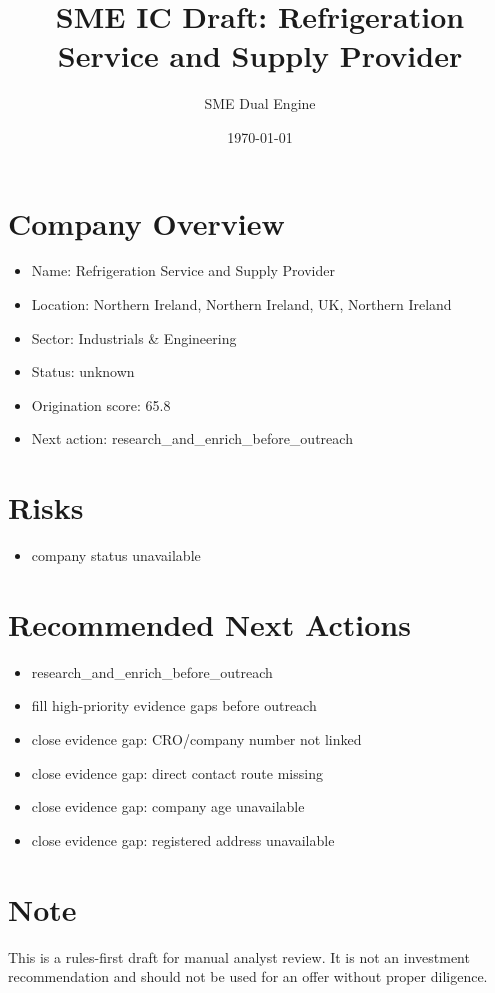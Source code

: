 \documentclass[11pt,a4paper]{article}
\title{SME IC Draft: Refrigeration Service and Supply Provider}
\author{SME Dual Engine}
\date{\today}
\begin{document}
\maketitle
\section*{Company Overview}
\begin{itemize}[leftmargin=1.4em]
\item Name: Refrigeration Service and Supply Provider
\item Location: Northern Ireland, Northern Ireland, UK, Northern Ireland
\item Sector: Industrials \& Engineering
\item Status: unknown
\item Origination score: 65.8
\item Next action: research\_and\_enrich\_before\_outreach
\end{itemize}
\section*{Risks}
\begin{itemize}[leftmargin=1.4em]
\item company status unavailable
\end{itemize}
\section*{Recommended Next Actions}
\begin{itemize}[leftmargin=1.4em]
\item research\_and\_enrich\_before\_outreach
\item fill high-priority evidence gaps before outreach
\item close evidence gap: CRO/company number not linked
\item close evidence gap: direct contact route missing
\item close evidence gap: company age unavailable
\item close evidence gap: registered address unavailable
\end{itemize}
\section*{Note}
This is a rules-first draft for manual analyst review. It is not an investment
recommendation and should not be used for an offer without proper diligence.
\end{document}
